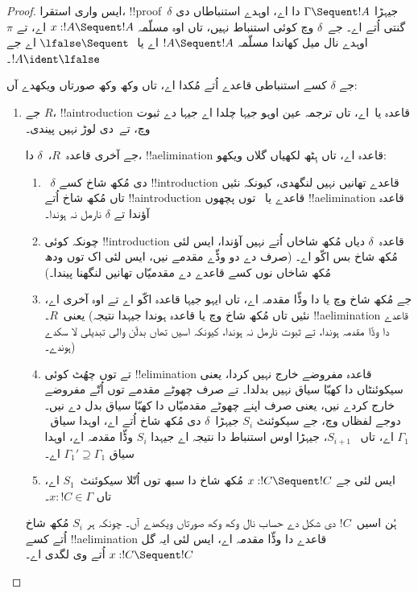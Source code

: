 \documentclass[../../../include/open-logic-section]{subfiles}
\begin{document}
\begin{proof}
ایس واری استقرا، !!{proof}~$\delta$ جیہڑا $ \Gamma \Sequent !A$ دا اے، اوہدے استنباطاں دی گنتی اُتے اے۔ جے~$\delta$ وچ کوئی استنباط نہیں، تاں اوہ مسلّمہ $x:!A \Sequent !A$ اے، تے $\pi$ اوہدے نال میل کھاندا مسلّمہ $!A \Sequent !A$ اے یا $ \lfalse \Sequent \ $ اے جے $!A
\ident \lfalse$۔

جے $\delta$ کسے استنباطی قاعدے اُتے مُکدا اے، تاں وکھ وکھ صورتاں ویکھدے آں:
\begin{enumerate}
  \item جے $R$، !!a{introduction} قاعدہ یا~\FalseInt اے، تاں ترجمہ عین اوہو جیہا چلدا اے جیہا  دے ثبوت وچ، تے~\Cut دی لوڑ نہیں پیندی۔

  جے آخری قاعدہ~$R$،~$\delta$ دا، !!a{elimination} قاعدہ اے، تاں ہِٹھ لکھیاں گلاں ویکھو:
  \begin{enumerate}
    \item~$\delta$ دی مُکھ شاخ کسے !!{introduction} قاعدے تھانیں نہیں لنگھدی، کیونکہ نئیں تاں مُکھ شاخ اُتے !!a{introduction} قاعدے یا~\FalseInt{} توں پچھوں !!a{elimination} قاعدہ آؤندا تے $\delta$ نارمل نہ ہوندا۔
    \item چونکہ کوئی !!{introduction} قاعدہ~$\delta$ دیاں مُکھ شاخاں اُتے نہیں آؤندا، ایس لئی مُکھ شاخ بس اکّو اے۔ (صرف \Intro{\land} دے دو وڈّے مقدمے نیں، ایس لئی اک توں ودھ مُکھ شاخاں نوں کسے \Intro{\land} قاعدے دے مقدمیّاں تھانیں لنگھنا پیندا۔)
    \item جے مُکھ شاخ وچ \Elim{\lor} یا \Elim{\lexists} دا وڈّا مقدمہ اے، تاں ایہو جیہا قاعدہ اکّو اے تے اوہ آخری اے، یعنی~$R$۔ (نئیں تاں مُکھ شاخ وچ \Elim{\lor} یا \Elim{\lexists} قاعدہ ہوندا جیہدا نتیجہ !!a{elimination} قاعدے دا وڈّا مقدمہ ہوندا، تے ثبوت نارمل نہ ہوندا، کیونکہ اسیں تھاں بدلّن والی تبدیلی لا سکدے ہوندے۔)
    \item \Elim{\lor} تے \Elim{\lexists} توں چھُٹ کوئی !!{elimination} قاعدہ مفروضے خارج نہیں کردا، یعنی سیکوئنٹاں دا کھبّا سیاق نہیں بدلدا۔ \Elim{\lor} تے \Elim{\lexists} صرف چھوٹے مقدمے توں اُتّے مفروضے خارج کردے نیں، یعنی صرف اپنے چھوٹے مقدمیّاں دا کھبّا سیاق بدل دے نیں۔ دوجے لفظاں وچ، جے سیکوئنٹ $S_i$ جیہڑا~$\delta$ دی مُکھ شاخ اُتے اے، اوہدا سیاق~$\Gamma_1$ اے، تاں ~$S_{i+1}$، جیہڑا اوس استنباط دا نتیجہ اے جیہدا $S_i$ وڈّا مقدمہ اے، اوہدا سیاق $\Gamma_1' \supseteq \Gamma_1$ اے۔
    \item ایس لئی جے $x: !C \Sequent !C$ مُکھ شاخ دا سبھ توں اُتّلا سیکوئنٹ~$S_1$ اے، تاں $x:!C \in \Gamma$۔
  \end{enumerate}
  ہُن اسیں~$!C$ دی شکل دے حساب نال وکھ وکھ صورتاں ویکھدے آں۔ چونکہ ہر $S_i$ مُکھ شاخ اُتے کسے !!a{elimination} قاعدے دا وڈّا مقدمہ اے، ایس لئی ایہ گل $x:!C \Sequent !C$ اُتے وی لگدی اے۔


\end{enumerate}
\end{proof}
\end{document}
